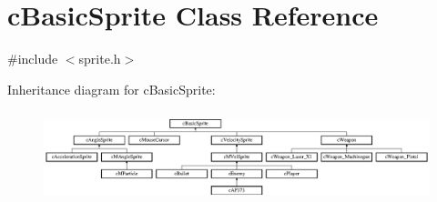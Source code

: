 \hypertarget{classc_basic_sprite}{\section{c\-Basic\-Sprite Class Reference}
\label{classc_basic_sprite}
}


{\ttfamily \#include $<$sprite.\-h$>$}

Inheritance diagram for c\-Basic\-Sprite\-:\begin{figure}[H]
\begin{center}
\leavevmode
\includegraphics[height=2.666667cm]{classc_basic_sprite}
\end{center}
\end{figure}
